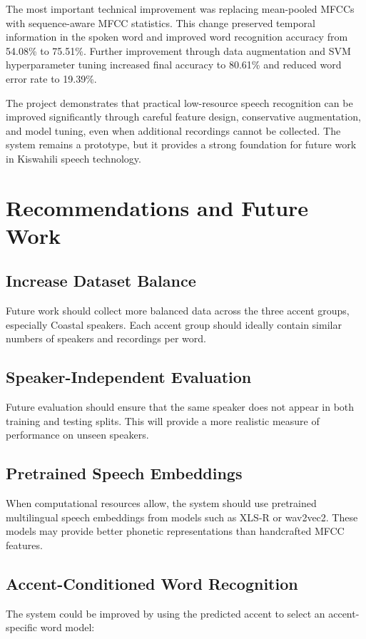 \documentclass[12pt,a4paper]{report}
\begin{document}
The most important technical improvement was replacing mean-pooled MFCCs with sequence-aware MFCC statistics. This change preserved temporal information in the spoken word and improved word recognition accuracy from 54.08\% to 75.51\%. Further improvement through data augmentation and SVM hyperparameter tuning increased final accuracy to 80.61\% and reduced word error rate to 19.39\%.

The project demonstrates that practical low-resource speech recognition can be improved significantly through careful feature design, conservative augmentation, and model tuning, even when additional recordings cannot be collected. The system remains a prototype, but it provides a strong foundation for future work in Kiswahili speech technology.

\chapter{Recommendations and Future Work}

\section{Increase Dataset Balance}
Future work should collect more balanced data across the three accent groups, especially Coastal speakers. Each accent group should ideally contain similar numbers of speakers and recordings per word.

\section{Speaker-Independent Evaluation}
Future evaluation should ensure that the same speaker does not appear in both training and testing splits. This will provide a more realistic measure of performance on unseen speakers.

\section{Pretrained Speech Embeddings}
When computational resources allow, the system should use pretrained multilingual speech embeddings from models such as XLS-R or wav2vec2. These models may provide better phonetic representations than handcrafted MFCC features.

\section{Accent-Conditioned Word Recognition}
The system could be improved by using the predicted accent to select an accent-specific word model:
\end{document}
